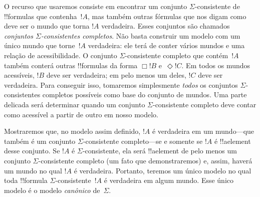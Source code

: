 \documentclass[../../../include/open-logic-section]{subfiles}
\begin{document}
O recurso que usaremos consiste em encontrar um conjunto
$\Sigma$-consistente de !!{formula}s que contenha~$!A$, mas também
outras fórmulas que nos digam como deve ser o mundo que torna $!A$
verdadeira. Esses conjuntos são chamados \emph{conjuntos
$\Sigma$-consistentes completos}. Não basta construir um modelo com um único mundo que
torne~$!A$ verdadeira: ele terá de conter vários mundos e uma relação
de acessibilidade. O conjunto $\Sigma$-consistente completo que
contém~$!A$ também conterá outras !!{formula}s da forma $\Box !B$
e~$\Diamond !C$. Em todos os mundos acessíveis, $!B$ deve ser
verdadeira; em pelo menos um deles, $!C$ deve ser verdadeira. Para
conseguir isso, tomaremos simplesmente \emph{todos} os conjuntos
$\Sigma$-consistentes completos possíveis como base do conjunto de
mundos. Uma parte delicada será determinar quando um conjunto
$\Sigma$-consistente completo deve contar como acessível a partir de
outro em nosso modelo.

Mostraremos que, no modelo assim definido, $!A$ é verdadeira em um
mundo---que também é um conjunto $\Sigma$-consistente completo---se e
somente se $!A$ é !!a{element} desse conjunto. Se $!A$ é
$\Sigma$-consistente, ela será !!a{element} de pelo menos um conjunto
$\Sigma$-consistente completo (um fato que demonstraremos) e, assim,
haverá um mundo no qual $!A$ é verdadeira. Portanto, teremos um único
modelo no qual toda !!{formula} $\Sigma$-consistente~$!A$ é verdadeira
em algum mundo. Esse único modelo é o modelo \emph{canônico}
de~$\Sigma$.
\end{document}
